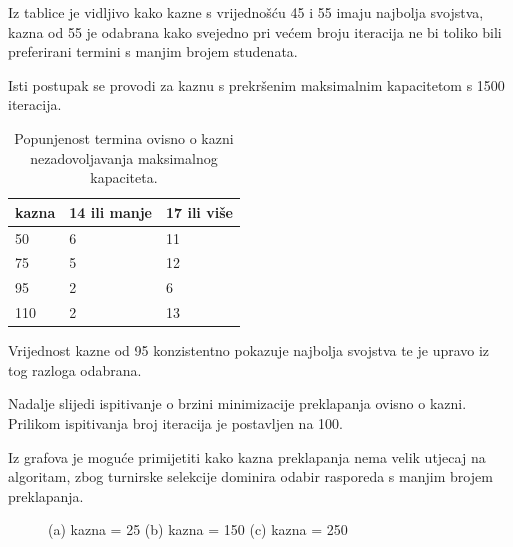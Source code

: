 \documentclass[times, utf8, zavrsni]{fer}
\begin{document}
Iz tablice je vidljivo kako kazne s vrijednošću 45 i 55 imaju najbolja svojstva, kazna od 55 je odabrana kako svejedno pri većem broju iteracija ne bi toliko bili preferirani termini s manjim brojem studenata.

Isti postupak se provodi za kaznu s prekršenim maksimalnim kapacitetom s 1500 iteracija.

\begin{table}[htb]
\caption{Popunjenost termina ovisno o kazni nezadovoljavanja maksimalnog kapaciteta.}
\label{tbl:max-popunjenost}
\centering
\begin{tabular}{lll} \hline
kazna & 14 ili manje &  17 ili više \\ \hline
50 & 6  & 11  \\
75 & 5 & 12 \\
95 & 2 & 6 \\
110 & 2 & 13 \\ \hline
\end{tabular}
\end{table}

Vrijednost kazne od 95 konzistentno pokazuje najbolja svojstva te je upravo iz tog razloga odabrana.

Nadalje slijedi ispitivanje o brzini minimizacije preklapanja ovisno o kazni.  Prilikom ispitivanja broj iteracija je postavljen na 100.

Iz grafova je moguće primijetiti kako kazna preklapanja nema velik utjecaj na algoritam, zbog turnirske selekcije dominira odabir rasporeda s manjim brojem preklapanja.

\begin{figure}
    \centering
    \caption{(a) kazna = 25 (b) kazna = 150 (c) kazna = 250}
    \label{fig:kazne}
\end{figure}
\newpage
\end{document}

